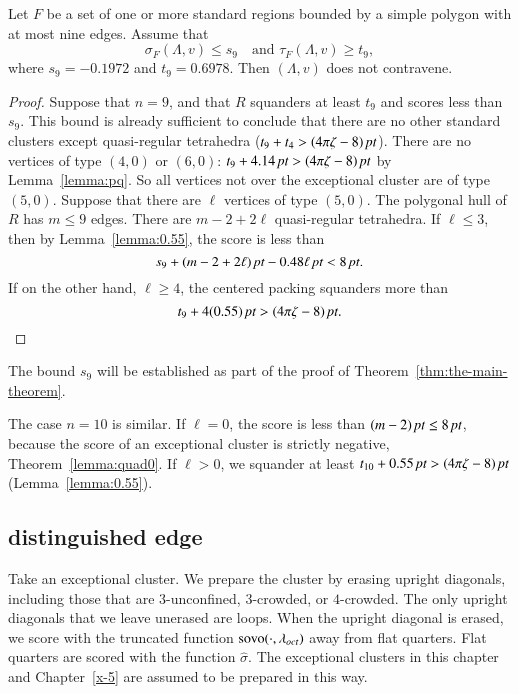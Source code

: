 \begin{lemma} \label{lemma:s9-t9}
Let $F$ be a set of one or more standard regions bounded by a simple
polygon with at most nine edges.  Assume  that
    $$\sigma_F(\Lambda,v) \le s_9\quad\text{and }\tau_F(\Lambda,v)\ge t_9,$$
where $s_9=-0.1972$ and $t_9=0.6978$.  Then $(\Lambda,v)$ does not
contravene.
\end{lemma}

\begin{proof}
Suppose that $n=9$, and that $R$ squanders at least $t_9$ and
scores less than $s_9$.  This bound is already sufficient to
conclude that there are no other standard clusters except
quasi-regular tetrahedra ($t_9+t_4>(4\pi\zeta-8)\,\hbox{\it pt}$). There are no
vertices of type $(4,0)$ or $(6,0)$: $t_9+4.14\,\hbox{\it pt}>(4\pi\zeta-8)\,\hbox{\it pt}$ by
Lemma~\ref{lemma:pq}.   So all vertices not over the exceptional
cluster are of type $(5,0)$. Suppose that there are $\ell$
vertices of type $(5,0)$. The polygonal hull of $R$ has $m\le 9$
edges. There are $m-2+2\ell$ quasi-regular tetrahedra. If $\ell\le
3$, then by Lemma~\ref{lemma:0.55}, the score is less than
    $$s_9+ (m-2+2\ell)\,\hbox{\it pt} -0.48 \ell\,\hbox{\it pt} < 8\,\hbox{\it pt}.$$
If on the other hand, $\ell\ge 4$, the centered packing squanders
more than
    $$t_9+ 4(0.55)\,\hbox{\it pt} > (4\pi\zeta-8)\,\hbox{\it pt}.$$
\end{proof}


The bound $s_9$ will be established as part of the proof of
Theorem~\ref{thm:the-main-theorem}.

The case $n=10$ is similar.  If $\ell=0$, the score is less than
    $(m-2)\,\hbox{\it pt}\le 8\,\hbox{\it pt}$,
because the score of an exceptional cluster is strictly negative,
Theorem~\ref{lemma:quad0}.  If $\ell>0$, we squander at least
    $t_{10}+ 0.55\,\hbox{\it pt} > (4\pi\zeta-8)\,\hbox{\it pt}$ (Lemma~\ref{lemma:0.55}).


\subsection{distinguished edge} %

Take an exceptional cluster.  We prepare the cluster by erasing
upright diagonals, including those that are $3$-unconfined,
$3$-crowded, or $4$-crowded.  The only upright diagonals that we
leave unerased are loops.  When the upright diagonal is erased, we
score with the truncated function ${\operatorname{sovo}}(\cdot,\lambda_{oct})$ 
away from flat
quarters.  Flat quarters are scored with the function
$\hat\sigma$. The exceptional clusters in this chapter and Chapter~\ref{x-5} 
are assumed to be prepared in this way.


